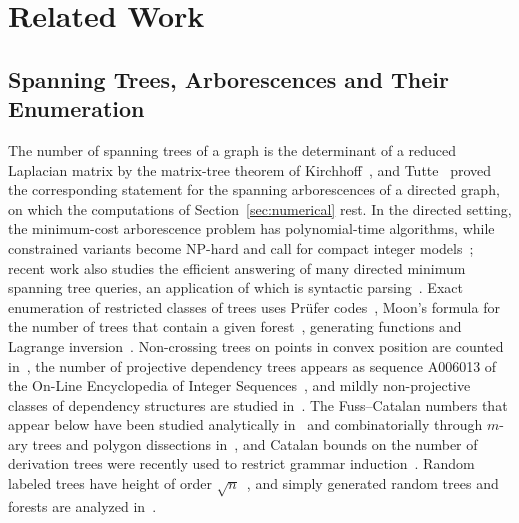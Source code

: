 \documentclass[mathematics,article,submit,pdftex,oneauthor]{Definitions/mdpi}
\begin{document}
\section{Related Work}\label{sec:related}

\subsection{Spanning Trees, Arborescences and Their Enumeration}
The number of spanning trees of a graph is the determinant of a reduced Laplacian matrix by the matrix-tree theorem of Kirchhoff~\cite{Kirchhoff1847}, and Tutte~\cite{Tutte1948} proved the corresponding statement for the spanning arborescences of a directed graph, on which the computations of Section~\ref{sec:numerical} rest.
In the directed setting, the minimum-cost arborescence problem has polynomial-time algorithms, while constrained variants become NP-hard and call for compact integer models~\cite{DellAmico2024Arborescence}; recent work also studies the efficient answering of many directed minimum spanning tree queries, an application of which is syntactic parsing~\cite{Wang2023DMST}.
Exact enumeration of restricted classes of trees uses Pr\"ufer codes~\cite{Prufer1918}, Moon's formula for the number of trees that contain a given forest~\cite{Moon1970,Pitman1999}, generating functions and Lagrange inversion~\cite{FlajoletSedgewick2009}.
Non-crossing trees on points in convex position are counted in~\cite{FlajoletNoy1999}, the number of projective dependency trees appears as sequence A006013 of the On-Line Encyclopedia of Integer Sequences~\cite{OEIS_A006013}, and mildly non-projective classes of dependency structures are studied in~\cite{Kuhlmann2013}.
The Fuss--Catalan numbers that appear below have been studied analytically in~\cite{Qi2018FussCatalan} and combinatorially through $m$-ary trees and polygon dissections in~\cite{Selim2025Angulations}, and Catalan bounds on the number of derivation trees were recently used to restrict grammar induction~\cite{Selim2026CFG}.
Random labeled trees have height of order $\sqrt n$~\cite{Renyi1967}, and simply generated random trees and forests are analyzed in~\cite{Huillet2025Binomial}.
\end{document}
